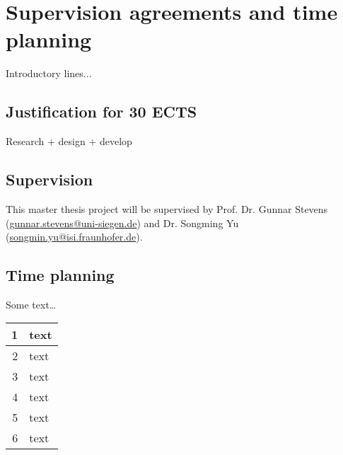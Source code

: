 \chapter{Supervision agreements and time planning} 

Introductory lines...

\section{Justification for 30 ECTS}

Research + design + develop

\section{Supervision}

This master thesis project will be supervised by 
Prof. Dr. Gunnar Stevens (\href{mailto:gunnar.stevens@uni-siegen.de}{gunnar.stevens@uni-siegen.de}) and 
Dr. Songming Yu (\href{mailto:songmin.yu@isi.fraunhofer.de}{songmin.yu@isi.fraunhofer.de}).  

\section{Time planning}

Some text\dots \\

\begin{center}
    \begin{tabular}{|r|l|}
    \hline 
    1 & \cellcolor{yellow}text \\
    \hline 
    2 & \cellcolor{lime}text \\
    \hline 
    3 & \cellcolor{cyan}text \\
    \hline 
    4 & \cellcolor{orange}text \\
    \hline 
    5 & \cellcolor{pink}text \\
    \hline 
    6 & \cellcolor{olive}text \\
    \hline 
    \end{tabular}
\end{center}

